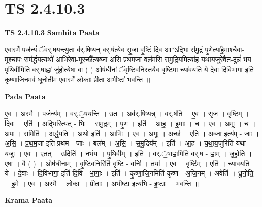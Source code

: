 \documentclass[17pt]{extarticle}
\begin{document}
\section{ TS 2.4.10.3 }

\textbf{TS 2.4.10.3 } \newline
\textbf{Samhita Paata} \newline

ए॒वास्मै॑ प॒र्जन्यं॑ ॅवर्.षयन्त्यु॒ता व॑र्.षिष्य॒न् वर्.ष॑त्ये॒व सृ॒जा वृ॒ष्टिं दि॒व आ*ऽद्भिः स॑मु॒द्रं पृ॒णेत्या॑हे॒माश्चै॒वा-मूश्चा॒पः सम॑र्द्धय॒त्यथो॑ आ॒भिरे॒वा-मूरच्छै᳚त्य॒ब्जा अ॑सि प्रथम॒जा बल॑मसि समु॒द्रिय॒मित्या॑ह यथाय॒जुरे॒वैत-दुन्नं॑ भय पृथि॒वीमिति॑ वर्.षा॒ह्वां जु॑होत्ये॒षा वा ( ) ओष॑धीनां ॅवृष्टि॒वनि॒स्तयै॒व वृष्टि॒मा च्या॑वयति॒ ये दे॒वा दि॒विभा॑गा॒ इति॑ कृष्णाजि॒नमव॑ धूनोती॒म ए॒वास्मै॑ लो॒काः प्री॒ता अ॒भीष्टा॑ भवन्ति ॥ \newline

\textbf{Pada Paata} \newline

ए॒व । अ॒स्मै॒ । प॒र्जन्य᳚म् । व॒र्.॒ष॒य॒न्ति॒ । उ॒त । अव॑र्.षिष्यन्न् । वर्.ष॑ति । ए॒व । सृ॒ज ।  वृ॒ष्टिम् । दि॒वः । एति॑ । अ॒द्भिरित्य॑त् - भिः । स॒मु॒द्रम् । पृ॒ण॒ । इति॑ । आ॒ह॒ । इ॒माः । च॒ । ए॒व । अ॒मूः । च॒ । अ॒पः । समिति॑ । अ॒र्द्ध॒य॒ति॒ । अथो॒ इति॑ । आ॒भिः । ए॒व । अ॒मूः । अच्छ॑ । ए॒ति॒ । अ॒ब्जा इत्य॑प् - जाः । अ॒सि॒ । प्र॒थ॒म॒जा इति॑ प्रथम - जाः । बल᳚म् । अ॒सि॒ । स॒मु॒द्रिय᳚म् । इति॑ । आ॒ह॒ । य॒था॒य॒जुरिति॑ यथा - य॒जुः । ए॒व । ए॒तत् । उदिति॑ । न॒भं॒य॒ । पृ॒थि॒वीम् । इति॑ । व॒र्.॒षा॒ह्वामिति॑ वर्.ष - ह्वाम् । जु॒हो॒ति॒ । ए॒षा । वै ( ) । ओष॑धीनाम् । वृ॒ष्टि॒वनि॒रिति॑ वृष्टि - वनिः॑ । तया᳚ । ए॒व । वृष्टि᳚म् । एति॑ । च्या॒व॒य॒ति॒ । ये । दे॒वाः । दि॒विभा॑गा॒ इति॑ दि॒वि - भा॒गाः॒ । इति॑ । कृ॒ष्णा॒जि॒नमिति॑ कृष्ण - अ॒जि॒नम् । अवेति॑ । धू॒नो॒ति॒ । इ॒मे । ए॒व । अ॒स्मै॒ । लो॒काः । प्री॒ताः । अ॒भीष्टा॒ इत्य॒भि - इ॒ष्टाः॒ । भ॒व॒न्ति॒ ॥  \newline


\textbf{Krama Paata} \newline
\end{document}
